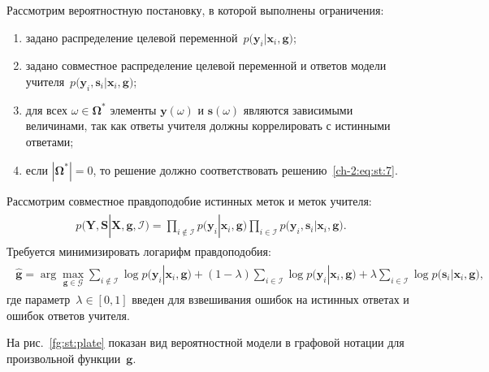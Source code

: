 \documentclass{dissert}
\begin{document}
Рассмотрим вероятностную постановку, в которой выполнены ограничения:
\begin{enumerate}[1)]
	\item задано распределение целевой переменной~$p\bigr(\mathbf{y}_i|\mathbf{x}_i, \mathbf{g}\bigr)$;
	\item задано совместное распределение целевой переменной и ответов модели учителя~$p\bigr(\mathbf{y}_i, \mathbf{s}_i|\mathbf{x}_i, \mathbf{g}\bigr)$;
	\item для всех $\omega \in \bm{\Omega}^*$ элементы $\mathbf{y}(\omega)$ и $\mathbf{s}(\omega)$ являются зависимыми величинами, так как ответы учителя должны коррелировать с истинными ответами;
	\item если $|\bm{\Omega}^*|=0$, то решение должно соответствовать решению~\eqref{ch-2:eq:st:7}.
\end{enumerate}

Рассмотрим совместное правдоподобие истинных меток и меток учителя:
\begin{gather}
\label{eq:st:8}
\begin{aligned}
p\bigr(\mathbf{Y}, \mathbf{S}|\mathbf{X}, \mathbf{g}, \mathcal{I}\bigr)=\prod_{i\not\in \mathcal{I}}p\bigr(\mathbf{y}_i|\mathbf{x}_i, \mathbf{g}\bigr)\prod_{i\in \mathcal{I}}p\bigr(\mathbf{y}_i, \mathbf{s}_i|\mathbf{x}_i, \mathbf{g}\bigr).
\end{aligned}
\end{gather}
Требуется минимизировать логарифм правдоподобия:
\begin{gather}
\label{eq:st:12}
\begin{aligned}
\hat{\mathbf{g}} = \arg\max_{\mathbf{g}\in \mathcal{G}} \sum_{i\not\in \mathcal{I}}\log p\bigr(\mathbf{y}_i|\mathbf{x}_i, \mathbf{g}\bigr) + \left(1-\lambda\right)\sum_{i\in \mathcal{I}}\log p\bigr(\mathbf{y}_i|\mathbf{x}_i, \mathbf{g}\bigr) + \lambda\sum_{i\in \mathcal{I}}\log p\bigr(\mathbf{s}_i|\mathbf{x}_i, \mathbf{g}\bigr),
\end{aligned}
\end{gather}
где параметр~$\lambda \in [0,1]$ введен для взвешивания ошибок на истинных ответах и ошибок ответов учителя.

На рис.~\ref{fg:st:plate} показан вид вероятностной модели в графовой нотации для произвольной функции~$\mathbf{g}$.
\end{document}
